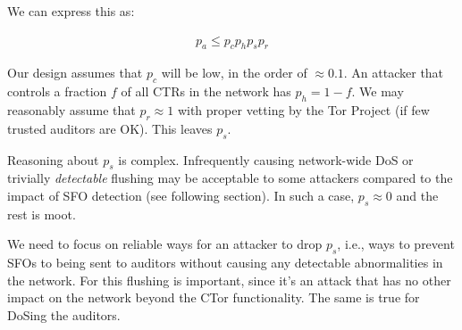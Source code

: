 We can express this as:  

\begin{align}
    p_a \leq p_c p_h p_s p_r
\end{align}

Our design assumes that $p_c$ will be low, in the order of $\approx0.1$. An
attacker that controls a fraction $f$ of all CTRs in the network has $p_h =
1-f$. We may reasonably assume that $p_r \approx 1$ with proper vetting by the
Tor Project (if few trusted auditors are OK). This leaves $p_s$.

Reasoning about $p_s$ is complex. Infrequently causing network-wide DoS or
trivially \emph{detectable} flushing may be acceptable to some attackers
compared to the impact of SFO detection (see following section). In such a case,
$p_s \approx 0$ and the rest is moot. 

We need to focus on reliable ways for an attacker to drop $p_s$, i.e., ways to
prevent SFOs to being sent to auditors without causing any detectable
abnormalities in the network. For this flushing is important, since it's an
attack that has no other impact on the network beyond the CTor functionality.
The same is true for DoSing the auditors. 
